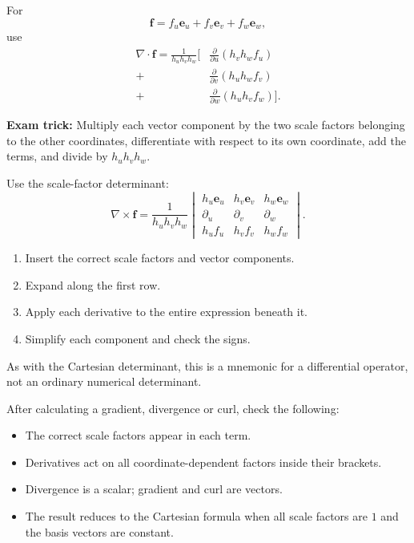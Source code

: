\begin{method}
  For
  \[
  \boldsymbol{f}=f_u\boldsymbol{e}_u+
  f_v\boldsymbol{e}_v+f_w\boldsymbol{e}_w,
  \]
  use
  \[
  \boxed{
  \begin{aligned}
  \nabla\cdot\boldsymbol{f}
  =\frac{1}{h_uh_vh_w}\bigg[
  &\frac{\partial}{\partial u}(h_vh_wf_u)\\
  +{}&\frac{\partial}{\partial v}(h_uh_wf_v)\\
  +{}&\frac{\partial}{\partial w}(h_uh_vf_w)
  \bigg].
  \end{aligned}
  }
  \]

  \textbf{Exam trick:} Multiply each vector component by the two scale factors belonging to the other coordinates, differentiate with respect to its own coordinate, add the terms, and divide by $h_uh_vh_w$.
\end{method}

\begin{method}
  Use the scale-factor determinant:
  \[
  \boxed{
  \nabla\times\boldsymbol{f}
  =\frac{1}{h_uh_vh_w}
  \begin{vmatrix}
  h_u\boldsymbol{e}_u&h_v\boldsymbol{e}_v&h_w\boldsymbol{e}_w\\
  \partial_u&\partial_v&\partial_w\\
  h_uf_u&h_vf_v&h_wf_w
  \end{vmatrix}.
  }
  \]

  \begin{enumerate}
    \item Insert the correct scale factors and vector components.
    \item Expand along the first row.
    \item Apply each derivative to the entire expression beneath it.
    \item Simplify each component and check the signs.
  \end{enumerate}

  As with the Cartesian determinant, this is a mnemonic for a differential operator, not an ordinary numerical determinant.
\end{method}

\begin{method}
  After calculating a gradient, divergence or curl, check the following:

  \begin{itemize}
    \item The correct scale factors appear in each term.
    \item Derivatives act on all coordinate-dependent factors inside their brackets.
    \item Divergence is a scalar; gradient and curl are vectors.
    \item The result reduces to the Cartesian formula when all scale factors are $1$ and the basis vectors are constant.
  \end{itemize}
\end{method}

